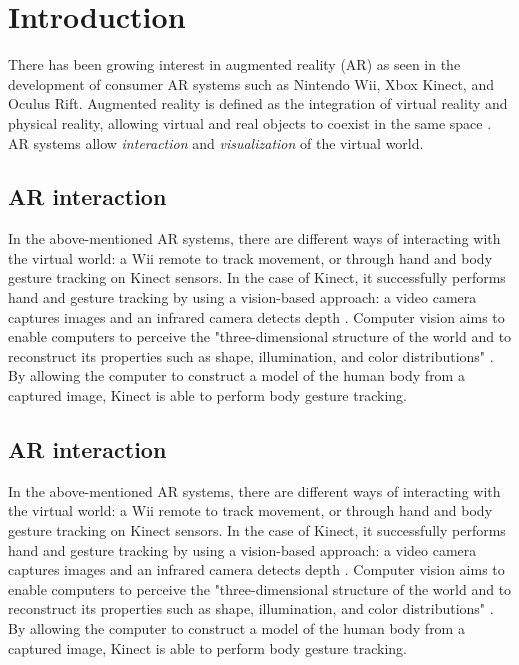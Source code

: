 \documentclass{acm_proc_article-sp}
\begin{document}

\section{Introduction}

There has been growing interest in augmented reality (AR) as seen in the development of consumer AR systems such as Nintendo Wii, Xbox Kinect, and Oculus Rift. Augmented reality is defined as the integration of virtual reality and physical reality, allowing virtual and real objects to coexist in the same space \cite{Azuma:1997}. AR systems allow \textit{interaction} and \textit{visualization} of the virtual world.

\subsection{AR interaction}

In the above-mentioned AR systems, there are different ways of interacting with the virtual world: a Wii remote to track movement, or through hand and body gesture tracking on Kinect sensors. In the case of Kinect, it successfully performs hand and gesture tracking by using a vision-based approach: a video camera captures images and an infrared camera detects depth \cite{Raheja:2011}. Computer vision aims to enable computers to perceive the "three-dimensional structure of the world and to reconstruct its properties such as shape, illumination, and color distributions" \cite[p.3]{Szelski:2010}. By allowing the computer to construct a model of the human body from a captured image, Kinect is able to perform body gesture tracking.

\subsection{AR interaction}
In the above-mentioned AR systems, there are different ways of interacting with the virtual world: a Wii remote to track movement, or through hand and body gesture tracking on Kinect sensors. In the case of Kinect, it successfully performs hand and gesture tracking by using a vision-based approach: a video camera captures images and an infrared camera detects depth \cite{Raheja:2011}. Computer vision aims to enable computers to perceive the "three-dimensional structure of the world and to reconstruct its properties such as shape, illumination, and color distributions" \cite[p.3]{Szelski:2010}. By allowing the computer to construct a model of the human body from a captured image, Kinect is able to perform body gesture tracking.
\end{document}
